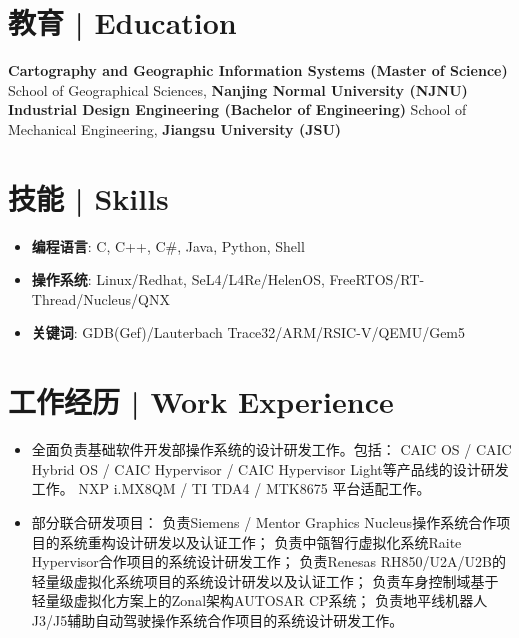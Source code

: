 \documentclass{resume}
\begin{document}
\section{教育 | Education}
\textbf{Cartography and Geographic Information Systems (Master of Science)}\newline
School of Geographical Sciences, \textbf{Nanjing Normal University (NJNU)}
\textbf{Industrial Design Engineering (Bachelor of Engineering)}\newline
School of Mechanical Engineering, \textbf{Jiangsu University (JSU)}

\section{技能 | Skills}
\begin{itemize}[parsep=0.2ex]
  \item \textbf{编程语言}: C, C++, C\#, Java, Python, Shell
  \item \textbf{操作系统}: Linux/Redhat, SeL4/L4Re/HelenOS, FreeRTOS/RT-Thread/Nucleus/QNX
  \item \textbf{关键词}: GDB(Gef)/Lauterbach Trace32/ARM/RSIC-V/QEMU/Gem5
\end{itemize}


\section{工作经历 | Work Experience}
\begin{itemize}
  \item 全面负责基础软件开发部操作系统的设计研发工作。包括：\newline
 CAIC OS / CAIC Hybrid OS / CAIC Hypervisor / CAIC Hypervisor Light等产品线的设计研发工作。\newline
 NXP i.MX8QM / TI TDA4 / MTK8675 平台适配工作。
  \item 部分联合研发项目：\newline
  负责Siemens / Mentor Graphics Nucleus操作系统合作项目的系统重构设计研发以及认证工作；\newline
  负责中瓴智行虚拟化系统Raite Hypervisor合作项目的系统设计研发工作；\newline
  负责Renesas RH850/U2A/U2B的轻量级虚拟化系统项目的系统设计研发以及认证工作；\newline
  负责车身控制域基于轻量级虚拟化方案上的Zonal架构AUTOSAR CP系统；\newline
  负责地平线机器人J3/J5辅助自动驾驶操作系统合作项目的系统设计研发工作。 
\end{itemize}
\end{document}
